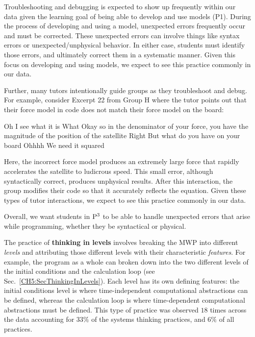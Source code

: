 \documentclass{msuphddissertation}
\begin{document}
\begin{doublespace}
Troubleshooting and debugging is expected to show up frequently within our data given the learning goal of being able to develop and use models (P1).  During the process of developing and using a model, unexpected errors frequently occur and must be corrected.  These unexpected errors can involve things like syntax errors or unexpected/unphysical behavior.  In either case, students must identify those errors, and ultimately correct them in a systematic manner.  Given this focus on developing and using models, we expect to see this practice commonly in our data.

Further, many tutors intentionally guide groups as they troubleshoot and debug.  For example, consider Excerpt 22 from Group H where the tutor points out that their force model in code does not match their force model on the board: \begin{description}
\TA Oh I see what it is
\SB What
\TA Okay so in the denominator of your force, you have the magnitude of the position of the satellite
\SB Right
\TA But what do you have on your board
\SB Ohhhh
\SC We need it squared
\end{description}  Here, the incorrect force model produces an extremely large force that rapidly accelerates the satellite to ludicrous speed.  This small error, although syntactically correct, produces unphysical results.  After this interaction, the group modifies their code so that it accurately reflects the equation.  Given these types of tutor interactions, we expect to see this practice commonly in our data.

Overall, we want students in ${\rm P}^{3}$ to be able to handle unexpected errors that arise while programming, whether they be syntactical or physical.

%
%
%

The practice of \textbf{thinking in levels} involves breaking the MWP into different \textit{levels} and attributing those different levels with their characteristic \textit{features}.  For example, the program as a whole can broken down into the two different levels of the initial conditions and the calculation loop (see Sec.~\ref{CH5:SecThinkingInLevels}).  Each level has its own defining features: the initial conditions level is where time-independent computational abstractions can be defined, whereas the calculation loop is where time-dependent computational abstractions must be defined.  This type of practice was observed $18$ times across the data  accounting for $33\%$ of the systems thinking practices, and $6\%$ of all practices.


\end{doublespace}
\end{document}
